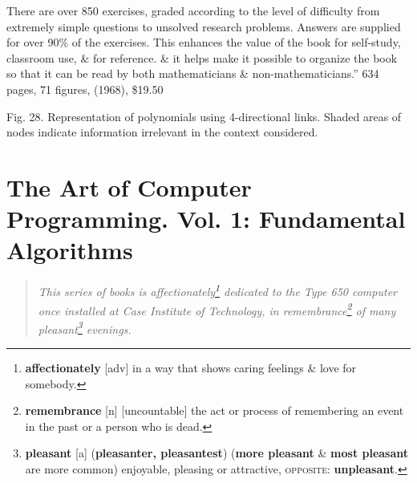 \documentclass[oneside]{book}
\numberwithin{equation}{section}
\begin{document}
There are over 850 exercises, graded according to the level of difficulty from extremely simple questions to unsolved research problems. Answers are supplied for over 90\% of the exercises. This enhances the value of the book for self-study, classroom use, \& for reference. \& it helps make it possible to organize the book so that it can be read by both mathematicians \& non-mathematicians.'' 634 pages, 71 figures, (1968), \$19.50

\textsf{Fig. 28. Representation of polynomials using 4-directional links. Shaded areas of nodes indicate information irrelevant in the context considered.}


\chapter{The Art of Computer Programming. Vol. 1: Fundamental Algorithms}

\begin{quotation}
	\textit{This series of books is affectionately\footnote{\textbf{affectionately} [adv] in a way that shows caring feelings \& love for somebody.} dedicated to the Type 650 computer once installed at Case Institute of Technology, in remembrance\footnote{\textbf{remembrance} [n] [uncountable] the act or process of remembering an event in the past or a person who is dead.} of many pleasant\footnote{\textbf{pleasant} [a] (\textbf{pleasanter, pleasantest}) (\textbf{more pleasant} \& \textbf{most pleasant} are more common) enjoyable, pleasing or attractive, \textsc{opposite}: \textbf{unpleasant}.} evenings.}
\end{quotation}
\end{document}
